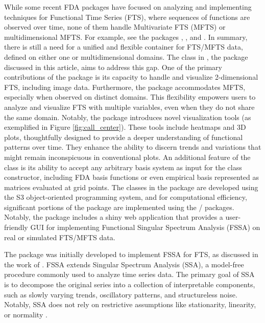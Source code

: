 While some recent FDA packages have focused on analyzing and implementing techniques for Functional Time Series (FTS), where sequences of functions are observed over time, none of them handle Multivariate FTS (MFTS) or multidimensional MFTS. For example, see the packages , , and . In summary, there is still a need for a unified and flexible container for FTS/MFTS data, defined on either one or multidimensional domains. The  class in  \citep{rfssapackage}, the package discussed in this article, aims to address this gap. One of the primary contributions of the package is its capacity to handle and visualize 2-dimensional FTS, including image data. Furthermore, the package accommodates MFTS, especially when observed on distinct domains. This flexibility empowers users to analyze and visualize FTS with multiple variables, even when they do not share the same domain. Notably, the  package introduces novel visualization tools (as exemplified in Figure \ref{fig:call_center}). These tools include heatmaps and 3D plots, thoughtfully designed to provide a deeper understanding of functional patterns over time. They enhance the ability to discern trends and variations that might remain inconspicuous in conventional plots. An additional feature of the  class is its ability to accept any arbitrary basis system as input for the class constructor, including FDA basis functions or even empirical basis represented as matrices evaluated at grid points. The classes in the  package are developed using the S3 object-oriented programming system, and for computational efficiency, significant portions of the package are implemented using the / packages. Notably, the package includes a shiny web application that provides a user-friendly GUI for implementing Functional Singular Spectrum Analysis (FSSA) on real or simulated FTS/MFTS data.

The  package was initially developed to implement FSSA for FTS, as discussed in the work of \cite{haghbin2021}. FSSA extends Singular Spectrum Analysis (SSA), a model-free procedure commonly used to analyze time series data. The primary goal of SSA is to decompose the original series into a collection of interpretable components, such as slowly varying trends, oscillatory patterns, and structureless noise. Notably, SSA does not rely on restrictive assumptions like stationarity, linearity, or normality \citep{golyandina2013}.

